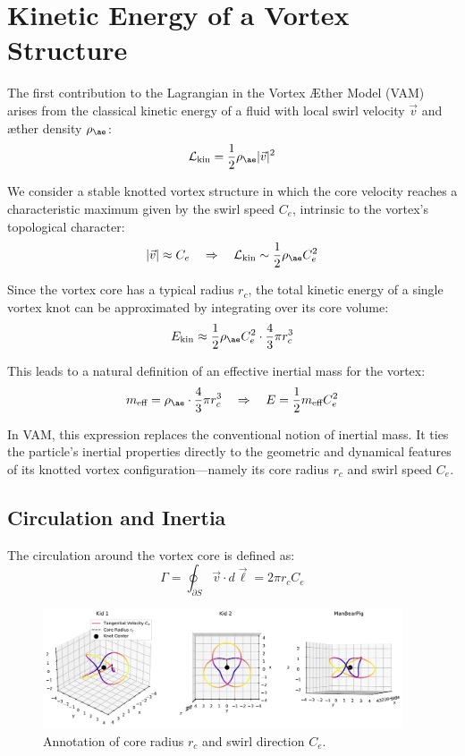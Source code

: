 \section{Kinetic Energy of a Vortex Structure}

The first contribution to the Lagrangian in the Vortex Æther Model (VAM) arises from the classical kinetic energy of a fluid with local swirl velocity $\vec{v}$ and æther density $\rho_{\ae}$:
\[
    \mathcal{L}_\text{kin} = \frac{1}{2} \rho_{\ae} |\vec{v}|^2
\]

We consider a stable knotted vortex structure in which the core velocity reaches a characteristic maximum given by the swirl speed $C_e$, intrinsic to the vortex's topological character:
\[
    |\vec{v}| \approx C_e \quad \Rightarrow \quad \mathcal{L}_\text{kin} \sim \frac{1}{2} \rho_{\ae} C_e^2
\]

Since the vortex core has a typical radius $r_c$, the total kinetic energy of a single vortex knot can be approximated by integrating over its core volume:
\[
    E_\text{kin} \approx \frac{1}{2} \rho_{\ae} C_e^2 \cdot \frac{4}{3}\pi r_c^3
\]

This leads to a natural definition of an effective inertial mass for the vortex:
\[
    m_\text{eff} = \rho_{\ae} \cdot \frac{4}{3}\pi r_c^3
    \quad \Rightarrow \quad E = \frac{1}{2} m_\text{eff} C_e^2
\]

In VAM, this expression replaces the conventional notion of inertial mass. It ties the particle’s inertial properties directly to the geometric and dynamical features of its knotted vortex configuration—namely its core radius $r_c$ and swirl speed $C_e$.

\subsection*{Circulation and Inertia}

The circulation around the vortex core is defined as:
\[
    \Gamma = \oint_{\partial S} \vec{v} \cdot d\vec{\ell} = 2\pi r_c C_e
\]

\begin{figure}[h!]
\centering
\includegraphics[width=0.95\textwidth]{vortex_knot_diagram}
\caption{Annotation of core radius $r_c$ and swirl direction $C_e$.}
\end{figure}

